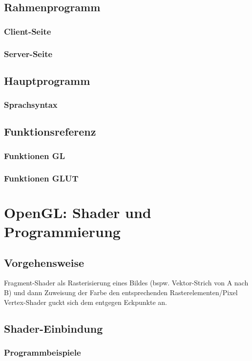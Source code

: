 \section{Rahmenprogramm}
\subsection{Client-Seite}
\subsection{Server-Seite}

\section{Hauptprogramm}
\subsection{Sprachsyntax}

\section{Funktionsreferenz}
\subsection{Funktionen GL}
\subsection{Funktionen GLUT}

\chapter{OpenGL: Shader und Programmierung}
\section{Vorgehensweise}
Fragment-Shader als Rasterisierung eines Bildes (bspw. Vektor-Strich von A nach B) und dann Zuweisung der Farbe den entsprechenden Rasterelementen/Pixel\\
Vertex-Shader guckt sich dem entgegen Eckpunkte an.
\section{Shader-Einbindung}
\subsection{Programmbeispiele}

